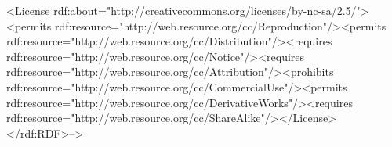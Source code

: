 \textless{}License
rdf:about="http://creativecommons.org/licenses/by-nc-sa/2.5/"\textgreater{}\textless{}permits
rdf:resource="http://web.resource.org/cc/Reproduction"/\textgreater{}\textless{}permits
rdf:resource="http://web.resource.org/cc/Distribution"/\textgreater{}\textless{}requires
rdf:resource="http://web.resource.org/cc/Notice"/\textgreater{}\textless{}requires
rdf:resource="http://web.resource.org/cc/Attribution"/\textgreater{}\textless{}prohibits
rdf:resource="http://web.resource.org/cc/CommercialUse"/\textgreater{}\textless{}permits
rdf:resource="http://web.resource.org/cc/DerivativeWorks"/\textgreater{}\textless{}requires
rdf:resource="http://web.resource.org/cc/ShareAlike"/\textgreater{}\textless{}/License\textgreater{}\textless{}/rdf:RDF\textgreater{}--\textgreater{}

